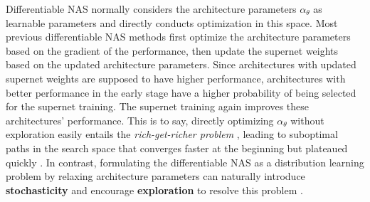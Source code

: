 \documentclass[10pt,twocolumn,letterpaper]{article}
\begin{document}
Differentiable NAS normally considers the architecture parameters $\alpha_\theta$ as learnable parameters and directly conducts optimization in this space. Most previous differentiable NAS methods first optimize the architecture parameters based on the gradient of the performance, then update the supernet weights based on the updated architecture parameters. Since architectures with updated supernet weights are supposed to have higher performance, architectures with better performance in the early stage have a higher probability of being selected for the supernet training. The supernet training again improves these architectures' performance. This is to say, directly optimizing $\alpha_\theta$ without exploration easily entails the \textit{rich-get-richer  problem} \cite{li2019improving,zhang2020one}, leading to suboptimal paths in the search space that converges faster at the beginning but plateaued quickly \cite{shu2019understanding,chen2020drnas}. In contrast, formulating the differentiable NAS as a distribution learning problem by relaxing architecture parameters can naturally introduce \textbf{stochasticity} and encourage \textbf{exploration} to resolve this problem \cite{chen2020drnas,chen2020stabilizing}.
\end{document}
